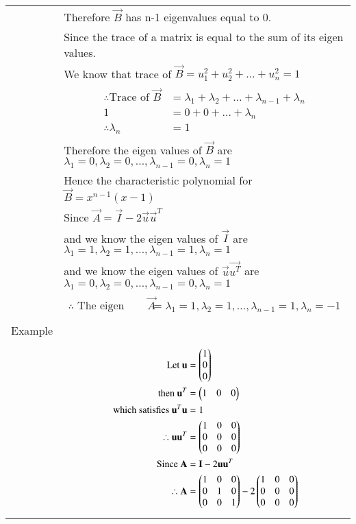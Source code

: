 \begin{longtable}{|l|l|}
&Therefore $\vec{B}$ has n-1 eigenvalues equal to 0.\\
&Since the trace of a matrix is equal to the sum of its eigen values.\\
&We know that trace of $\vec{B}=u_1^2+u_2^2+\dots+u_n^2=1$\\
&\parbox{10cm}{\begin{align*}
    \therefore\mbox{Trace of }\vec{B}&=\lambda_1+\lambda_2+\dots+\lambda_{n-1}+\lambda_n\\
    1&=0+0+\dots+\lambda_n\\
    \therefore \lambda_n&=1
\end{align*}}\\
&Therefore the eigen values of $\vec{B}$ are $\lambda_1=0,\lambda_2=0,\dots,\lambda_{n-1}=0,\lambda_n=1$\\
&Hence the characteristic polynomial for $\vec{B}=x^{n-1}(x-1)$\\
&Since $\vec{A}=\vec{I}-2\vec{u}\vec{u}^T$\\
&and we know the eigen values of $\vec{I}$ are $\lambda_1=1,\lambda_2=1,\dots,\lambda_{n-1}=1,\lambda_n=1$\\
&and we know the eigen values of $\vec{u}\vec{u^T}$ are $\lambda_1=0,\lambda_2=0,\dots,\lambda_{n-1}=0,\lambda_n=1$\\
&\parbox{14cm}{\begin{align}
 \therefore\mbox{ The eigen values of }\vec{A}&=\lambda_1=1,\lambda_2=1,\dots,\lambda_{n-1}=1,\lambda_n=-1\label{eq:solutions/2015/june/78/eq:eigen_values_of_general_A}   
\end{align}}\\
\hline
&\\
Example&\\
&\parbox{14cm}{\begin{align}
    \mbox{Let }\vec{u}&=\myvec{1\\0\\0}\\
    \mbox{then }\vec{u}^T&=\myvec{1&0&0}\\
    \mbox{ which satisfies }\vec{u}^T\vec{u}&=1\\
    \therefore \vec{u}\vec{u}^T&=\myvec{1&0&0\\0&0&0\\0&0&0}\\
    \mbox{Since }\vec{A}&=\vec{I}-2\vec{u}\vec{u}^T\\
    \therefore \vec{A}&=\myvec{1&0&0\\0&1&0\\0&0&1}-2\myvec{1&0&0\\0&0&0\\0&0&0}\\

\end{align}}
\end{longtable}
